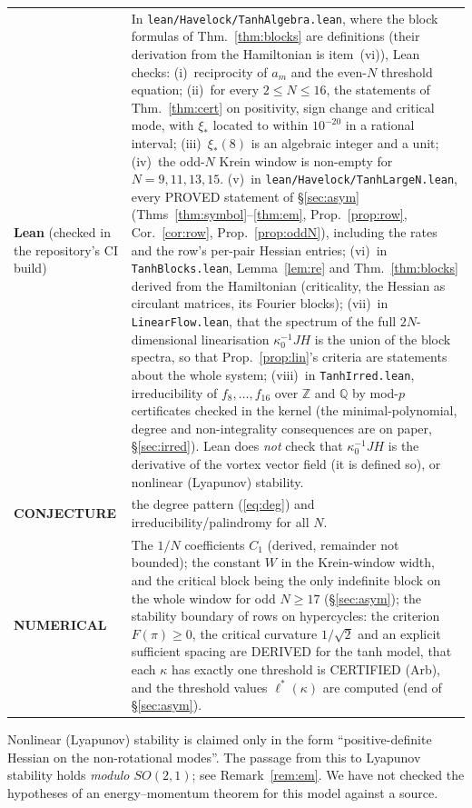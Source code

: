 \documentclass[11pt]{article}
\theoremstyle{remark}
\begin{document}
\begin{center}
\begin{tabular}{p{}p{}}
\textbf{Lean} (checked in the repository's CI build) & In \texttt{lean/Havelock/TanhAlgebra.lean}, where the block
formulas of Thm.~\ref{thm:blocks} are definitions (their derivation from the Hamiltonian is item~(vi)), Lean checks:
(i)~reciprocity of $a_m$ and the even-$N$ threshold equation;
(ii)~for every $2\le N\le16$, the statements of Thm.~\ref{thm:cert} on positivity, sign change and critical mode,
with $\xi_*$ located to within $10^{-20}$ in a rational interval;
(iii)~$\xi_*(8)$ is an algebraic integer and a unit;
(iv)~the odd-$N$ Krein window is non-empty for $N=9,11,13,15$.
(v)~in \texttt{lean/Havelock/TanhLargeN.lean}, every PROVED statement of \S\ref{sec:asym} (Thms~\ref{thm:symbol}--\ref{thm:em},
Prop.~\ref{prop:row}, Cor.~\ref{cor:row}, Prop.~\ref{prop:oddN}), including the rates and the row's per-pair Hessian
entries; (vi)~in \texttt{TanhBlocks.lean}, Lemma~\ref{lem:re} and Thm.~\ref{thm:blocks} derived from the Hamiltonian
(criticality, the Hessian as circulant matrices, its Fourier blocks); (vii)~in \texttt{LinearFlow.lean}, that the
spectrum of the full $2N$-dimensional linearisation $\kappa_0^{-1}JH$ is the union of the block spectra, so that
Prop.~\ref{prop:lin}'s criteria are statements about the whole system; (viii)~in \texttt{TanhIrred.lean},
irreducibility of $f_8,\dots,f_{16}$ over $\mathbb Z$ and $\mathbb Q$ by mod-$p$ certificates checked in the kernel
(the minimal-polynomial, degree and non-integrality consequences are on paper, \S\ref{sec:irred}).
Lean does \emph{not} check that $\kappa_0^{-1}JH$ is the derivative of the vortex vector field (it is defined so), or
nonlinear (Lyapunov) stability.\\
\textbf{CONJECTURE} & the degree pattern (\ref{eq:deg}) and irreducibility/palindromy for all $N$.\\
\textbf{NUMERICAL} & The $1/N$ coefficients
$C_1$ (derived, remainder not bounded); the constant $W$ in the Krein-window width, and the critical block being the
only indefinite block on the whole window for odd $N\ge17$ (\S\ref{sec:asym}); the stability boundary of rows on
hypercycles: the criterion $F(\pi)\ge0$, the critical curvature $1/\sqrt2$ and an explicit sufficient spacing are DERIVED for
the tanh model, that each $\kappa$ has exactly one threshold is CERTIFIED (Arb), and the threshold values $\ell^*(\kappa)$ are
computed (end of \S\ref{sec:asym}).\\\bottomrule
\end{tabular}
\end{center}
Nonlinear (Lyapunov) stability is claimed only in the form ``positive-definite Hessian on the non-rotational
modes''. The passage from this to Lyapunov stability holds \emph{modulo $SO(2,1)$}; see Remark~\ref{rem:em}. We have not checked
the hypotheses of an energy--momentum theorem for this model against a source.
\end{document}

